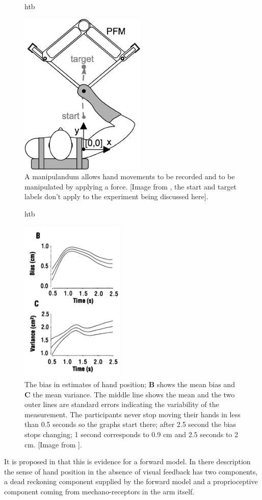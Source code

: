 \documentclass[12pt]{article}
\begin{document}
\begin{figure}{htb}
\begin{center}
  \includegraphics[width=6cm]{manipulandum.jpg}
\end{center}
\caption{A manipulandum allows hand movements to be recorded and to be manipulated by applying a force. [Image from \cite{MistryEt2013}, the start and target labels don't apply to the experiment being discussed here].\label{fig_manipulandum}}
\end{figure}


\begin{figure}{htb}
\begin{center}
  \includegraphics[width=5cm]{fig_overestimate.png}
\end{center}
\caption{The bias in estimates of hand position; \textbf{B} shows the
  mean bias and \textbf{C} the mean variance. The middle line shows
  the mean and the two outer lines are standard errors indicating the
  variability of the measurement. The participants never stop moving their hands in less than 0.5 seconds so the graphs start there; after 2.5 second the bias stops changing; 1 second corresponds to 0.9 cm and 2.5 seconds to 2 cm. [Image from
    \cite{WolpertEtAl1995}].\label{fig_manipulandum}}
\end{figure}

It is proposed in \cite{WolpertEtAl1995} that this is evidence for a
forward model. In there description the sense of hand position in the
absence of visual feedback has two components, a dead reckoning
component supplied by the forward model and a proprioceptive component
coming from mechano-receptors in the arm itself.


 {}
\end{document}
